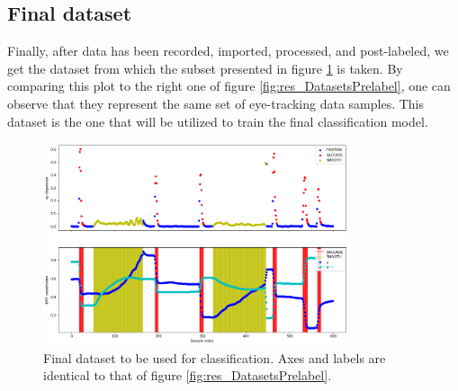 
\subsection{Final dataset}

Finally, after data has been recorded, imported, processed, and post-labeled, we get the dataset from which the subset presented in figure \ref{fig:res_DatasetFinal} is taken. By comparing this plot to the right one of figure \ref{fig:res_DatasetsPrelabel}, one can observe that they represent the same set of eye-tracking data samples. This dataset is the one that will be utilized to train the final classification model.

\begin{figure}[h]
    \centering
    \includegraphics[width=0.8\textwidth]{Images/Dataset/DatasetFinal.png}
    \caption{Final dataset to be used for classification. Axes and labels are identical to that of figure \ref{fig:res_DatasetsPrelabel}.}
    \label{fig:res_DatasetFinal}
\end{figure}

\FloatBarrier